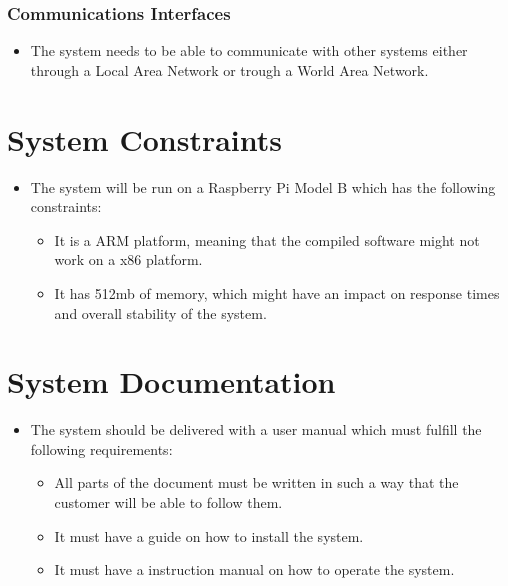 \subsubsection{Communications Interfaces}

\begin{itemize}
\item The system needs to be able to communicate with other systems either through a Local Area Network or trough a World Area Network.
\end{itemize}

\section{System Constraints}

\begin{itemize}
\item The system will be run on a Raspberry Pi Model B which has the following constraints:
  \begin{itemize}
  \item It is a ARM platform, meaning that the compiled software might not work on a x86 platform.
  \item It has 512mb of memory, which might have an impact on response times and overall stability of the system.
  \end{itemize}
  \end{itemize}

\section{System Documentation}

\begin{itemize}
\item The system should be delivered with a user manual which must fulfill the following requirements:
  \begin{itemize}
  \item All parts of the document must be written in such a way that the customer will be able to follow them.
  \item It must have a guide on how to install the system.
  \item It must have a instruction manual on how to operate the system.
  \end{itemize}
\end{itemize}
